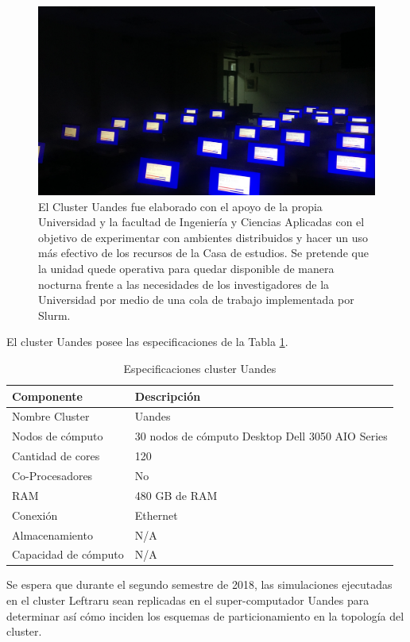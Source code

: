 \begin{figure}[H]
\begin{center}
   \includegraphics[scale=0.145]{images/c03/cluster_uandes.jpg}
\end{center}

\caption[Cluster Uandes en ejecución]{El Cluster Uandes fue elaborado con el apoyo de la propia Universidad y la facultad de Ingeniería y Ciencias Aplicadas con el objetivo de experimentar con ambientes distribuidos y hacer un uso más efectivo de los recursos de la Casa de estudios. Se pretende que la unidad quede operativa para quedar disponible de manera nocturna frente a las necesidades de los investigadores de la Universidad por medio de una cola de trabajo implementada por Slurm.}
\label{c03_cluster_uandes} %
\end{figure}

El cluster Uandes posee las especificaciones de la Tabla \ref{table_uandes_cluster_configuration}.

\begin{table}[H]
\begin{tabular}{p{5cm}p{9.3cm}} \toprule
    \textbf{Componente} & \textbf{Descripción}\\ \midrule
    Nombre Cluster & Uandes \\
    Nodos de cómputo & 30 nodos de cómputo Desktop Dell 3050 AIO Series\\
    Cantidad de cores & 120 \\
    Co-Procesadores & No \\
    RAM & 480 GB de RAM \\
    Conexión & Ethernet\\
    Almacenamiento & N/A\\
    Capacidad de cómputo & N/A \\
    \bottomrule

\end{tabular}
\caption[Especificaciones cluster Uandes]{Especificaciones cluster Uandes}
    \label{table_uandes_cluster_configuration}
\end{table}

Se espera que durante el segundo semestre de 2018, las simulaciones ejecutadas en el cluster Leftraru sean replicadas en el super-computador Uandes para determinar así cómo inciden los esquemas de particionamiento en la topología del cluster.
